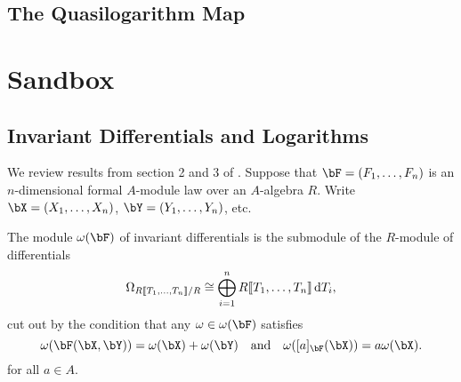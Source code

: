 \documentclass[../main.tex]{subfiles}
\begin{document}
\subsection{The Quasilogarithm Map} %
\label{sub:The Quasilogarithm map}


\section{Sandbox} %
\label{sec:Sandbox}
\subsection{Invariant Differentials and Logarithms} %
\label{sub:Invariant Differentials and Logarithms}

We review results from section
2 and 3 of \cite{hopkins1994equivariant}. 
Suppose that $\bF = (F_1, \dots, F_n)$ is an $n$-dimensional formal $A$-module law over an
$A$-algebra $R$. Write $\bX = (X_1, \dots, X_n)$, $\bY = (Y_1, \dots, Y_n)$, etc.

\begin{defi}
  The module $\omega(\bF)$ of invariant differentials is the submodule of the
  $R$-module of differentials
  \begin{equation*}
    \Omega_{R\llbracket T_1, \dots, T_n \rrbracket/R} \cong \bigoplus_{i=1}^n R\llbracket T_1, \dots, T_n
    \rrbracket \, \mathrm{d} T_i,
  \end{equation*}
  cut out by the condition that any $\omega \in \omega(\bF)$ satisfies
  \begin{equation}\label{eq:diffcond}
    \omega(\bF(\bX,\bY)) = \omega(\bX) + \omega(\bY)\quad \text{and} \quad
    \omega([a]_\bF(\bX)) = a\omega(\bX).
  \end{equation} 
  for all $a \in A$. 
\end{defi}
\end{document}
